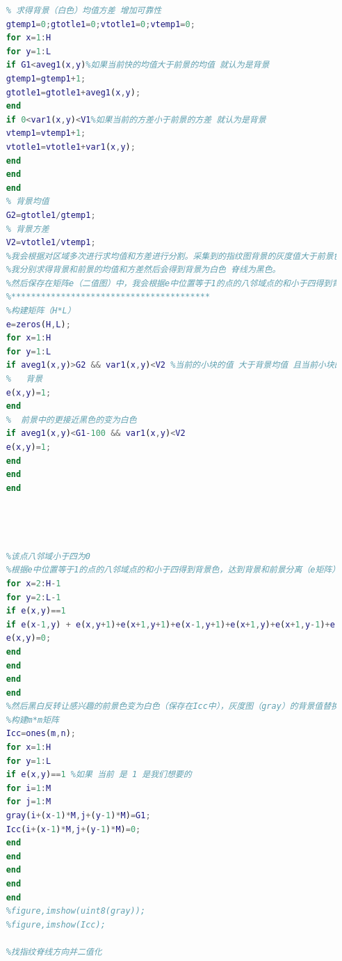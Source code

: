 \documentclass{whutmod}
\begin{document}
\begin{lstlisting}[language=matlab]
	%再次与刚刚产生的值相比
	% 求得背景（白色）均值方差 增加可靠性
	gtemp1=0;gtotle1=0;vtotle1=0;vtemp1=0;
	for x=1:H
	for y=1:L
	if G1<aveg1(x,y)%如果当前快的均值大于前景的均值 就认为是背景
	gtemp1=gtemp1+1;
	gtotle1=gtotle1+aveg1(x,y);
	end
	if 0<var1(x,y)<V1%如果当前的方差小于前景的方差 就认为是背景
	vtemp1=vtemp1+1;
	vtotle1=vtotle1+var1(x,y);
	end
	end
	end
	% 背景均值
	G2=gtotle1/gtemp1;
	% 背景方差
	V2=vtotle1/vtemp1;
	%我会根据对区域多次进行求均值和方差进行分割。采集到的指纹图背景的灰度值大于前景色，背景主要为低频，所以背景的方差小于前景的方差。
	%我分别求得背景和前景的均值和方差然后会得到背景为白色 脊线为黑色。
	%然后保存在矩阵e（二值图）中，我会根据e中位置等于1的点的八邻域点的和小于四得到背景色，达到背景和前景分离（e矩阵）。
	%****************************************
	%构建矩阵（H*L）
	e=zeros(H,L);
	for x=1:H
	for y=1:L
	if aveg1(x,y)>G2 && var1(x,y)<V2 %当前的小块的值 大于背景均值 且当前小块的方差小于背景方差 
	%   背景
	e(x,y)=1;
	end
	%  前景中的更接近黑色的变为白色
	if aveg1(x,y)<G1-100 && var1(x,y)<V2
	e(x,y)=1;
	end
	end
	end
	
	
	
	
	%该点八邻域小于四为0
	%根据e中位置等于1的点的八邻域点的和小于四得到背景色，达到背景和前景分离（e矩阵）
	for x=2:H-1
	for y=2:L-1
	if e(x,y)==1
	if e(x-1,y) + e(x,y+1)+e(x+1,y+1)+e(x-1,y+1)+e(x+1,y)+e(x+1,y-1)+e(x,y-1)+e(x-1,y-1) <=4
	e(x,y)=0;
	end
	end
	end
	end
	%然后黑白反转让感兴趣的前景色变为白色（保存在Icc中），灰度图（gray）的背景值替换为小区域块的和的均值（G1）.
	%构建m*m矩阵
	Icc=ones(m,n);
	for x=1:H
	for y=1:L
	if e(x,y)==1 %如果 当前 是 1 是我们想要的
	for i=1:M
	for j=1:M
	gray(i+(x-1)*M,j+(y-1)*M)=G1;
	Icc(i+(x-1)*M,j+(y-1)*M)=0;
	end
	end
	end
	end
	end
	%figure,imshow(uint8(gray));
	%figure,imshow(Icc);
	
	%找指纹脊线方向并二值化
	

\end{lstlisting}
\end{document}
